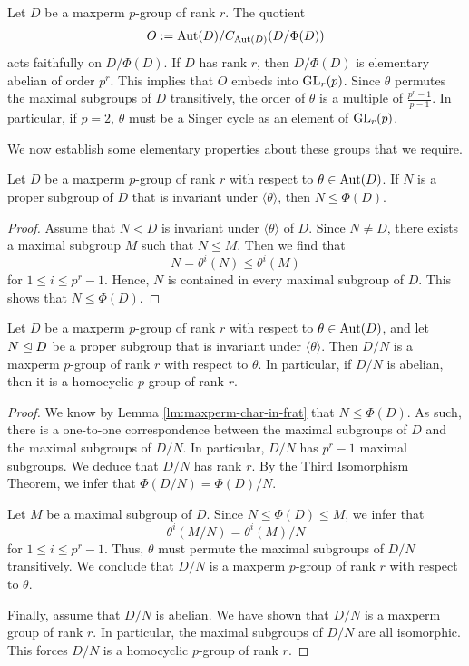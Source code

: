\documentclass[bysection, amsart]{standard}
\begin{document}
Let $D$ be a maxperm $p$-group of rank $r$. The quotient
\[O := \operatorname{Aut}(D)/C_{\operatorname{Aut}(D)}(D/\Phi(D))\]
acts faithfully on $D/\Phi(D)$. If $D$ has rank $r$, then $D/\Phi(D)$ is elementary abelian of order $p^r$. This implies that $O$ embeds into $\operatorname{GL}_r(p)$. Since $\theta$ permutes the maximal subgroups of $D$ transitively, the order of $\theta$ is a multiple of $\frac{p^r-1}{p-1}$. In particular, if $p=2$, $\theta$ must be a Singer cycle as an element of $\operatorname{GL}_r(p)$. 

We now establish some elementary properties about these groups that we require.
\begin{lemma} \label{lm:maxperm-char-in-frat}
    Let $D$ be a maxperm $p$-group of rank $r$ with respect to $\theta \in \operatorname{Aut}(D)$. If $N$ is a proper subgroup of $D$ that is invariant under $\langle \theta \rangle$, then $N \leq \Phi(D)$.
\end{lemma}
\begin{proof}
    Assume that $N < D$ is invariant under $\langle \theta \rangle$ of $D$. Since $N \neq D$, there exists a maximal subgroup $M$ such that $N \leq M$. Then we find that 
    \[N = \theta^i(N) \leq \theta^i(M)\]
    for $1 \leq i \leq p^r - 1$. Hence, $N$ is contained in every maximal subgroup of $D$. This shows that $N \leq \Phi(D)$.
\end{proof}

\begin{lemma} \label{lm:maxperm-quo}
    Let $D$ be a maxperm $p$-group of rank $r$ with respect to $\theta \in \operatorname{Aut}(D)$, and let $N \trianglelefteq D$ be a proper subgroup that is invariant under $\langle \theta \rangle$. Then $D/N$ is a maxperm $p$-group of rank $r$ with respect to $\theta$. In particular, if $D/N$ is abelian, then it is a homocyclic $p$-group of rank $r$.
\end{lemma}
\begin{proof}
    We know by Lemma \ref{lm:maxperm-char-in-frat} that $N \leq \Phi(D)$. As such, there is a one-to-one correspondence between the maximal subgroups of $D$ and the maximal subgroups of $D/N$. In particular, $D/N$ has $p^r-1$ maximal subgroups. We deduce that $D/N$ has rank $r$. By the Third Isomorphism Theorem, we infer that $\Phi(D/N) = \Phi(D)/N$.
    
    Let $M$ be a maximal subgroup of $D$. Since $N \leq \Phi(D) \leq M$, we infer that
    \[\theta^i(M/N) = \theta^i(M)/N\]
    for $1 \leq i \leq p^r - 1$. Thus, $\theta$ must permute the maximal subgroups of $D/N$ transitively. We conclude that $D/N$ is a maxperm $p$-group of rank $r$ with respect to $\theta$.

    Finally, assume that $D/N$ is abelian. We have shown that $D/N$ is a maxperm group of rank $r$. In particular, the maximal subgroups of $D/N$ are all isomorphic. This forces $D/N$ is a homocyclic $p$-group of rank $r$.
\end{proof}
\end{document}
